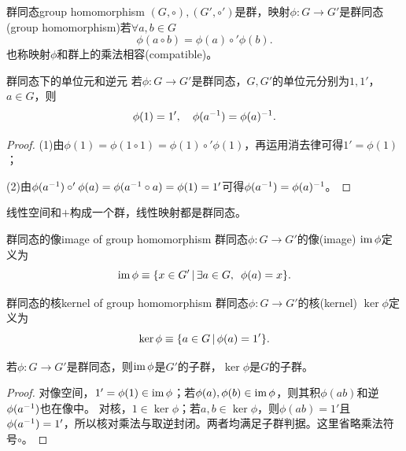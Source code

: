 \begin{definition}{群同态}{group homomorphism}
	$(G, \circ),(G', \circ ')$是群，映射$\phi:G \to G'$是群同态(group homomorphism)若$\forall a,b \in G$
	\begin{equation}
		\phi(a \circ b) = \phi(a) \circ '\phi(b).
	\end{equation}
	也称映射$\phi$和群上的乘法相容(compatible)。
\end{definition}
\begin{theorem}{群同态下的单位元和逆元}{}
	若$\phi:G \to G'$是群同态，$G,G'$的单位元分别为$1,1'$，$a \in G$，则
	\begin{equation}
		\phi(1) = 1',\quad \phi(a^{-1}) = \phi(a)^{-1}.
	\end{equation}
\end{theorem}
\begin{proof}
	(1)由$\phi(1) = \phi(1 \circ 1) = \phi(1) \circ '\phi(1)$，再运用消去律可得$1' = \phi(1)$；

	(2)由$\phi(a^{-1}) \circ '\phi(a) = \phi(a^{-1} \circ a) = \phi(1) = 1'$可得$\phi(a^{-1}) = \phi(a)^{-1}$。
\end{proof}
\begin{example}
	{}{}
	线性空间和$+$构成一个群，线性映射都是群同态。
\end{example}
\begin{definition}{群同态的像}{image of group homomorphism}
	群同态$\phi:G \to G'$的像(image) $\operatorname{im}\phi$定义为
	\begin{equation}
		\operatorname{im}\phi \equiv \{x \in G'\,\vert\,\exists a \in G,\enspace\phi(a) = x\}.
	\end{equation}
\end{definition}
\begin{definition}{群同态的核}{kernel of group homomorphism}
	群同态$\phi:G \to G'$的核(kernel) $\ker\phi$定义为
	\begin{equation}
		\ker\phi \equiv \{a \in G\,\vert\,\phi(a) = 1'\}.
	\end{equation}
\end{definition}
\begin{theorem}{}{}
	若$\phi:G \to G'$是群同态，则$\operatorname{im}\phi$是$G'$的子群，$\ker\phi$是$G$的子群。
\end{theorem}
\begin{proof}
    对像空间，$1' = \phi(1) \in \operatorname{im}\phi$；若$\phi(a),\phi(b) \in \operatorname{im}\phi$，则其积$\phi(ab)$和逆$\phi(a^{-1})$也在像中。
    对核，$1 \in \ker\phi$；若$a,b \in \ker\phi$，则$\phi(ab) = 1'$且$\phi(a^{-1}) = 1'$，所以核对乘法与取逆封闭。两者均满足子群判据。这里省略乘法符号$\circ$。
\end{proof}
